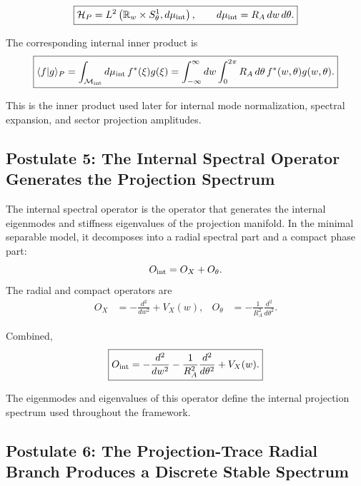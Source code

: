 \documentclass[11pt]{article}
\begin{document}
\begin{equation}
\boxed{
\mathcal H_P
=
L^2
\left(
\mathbb R_w\times S^1_\theta,
d\mu_{\rm int}
\right),
\qquad
d\mu_{\rm int}=R_A\,dw\,d\theta.
}
\end{equation}

The corresponding internal inner product is
\begin{equation}
\boxed{
\langle f|g\rangle_P
=
\int_{\mathcal M_{\rm int}}
d\mu_{\rm int}\,
f^*(\xi)g(\xi)
=
\int_{-\infty}^{\infty}dw
\int_0^{2\pi}
R_A\,d\theta\,
f^*(w,\theta)g(w,\theta).
}
\end{equation}

This is the inner product used later for internal mode normalization, spectral expansion, and sector projection amplitudes.

\subsection{Postulate 5: The Internal Spectral Operator Generates the Projection Spectrum}
\label{sec:postulate_internal_operator_projection_spectrum}

The internal spectral operator is the operator that generates the internal eigenmodes and stiffness eigenvalues of the projection manifold. In the minimal separable model, it decomposes into a radial spectral \cite{BenderWu1969} part and a compact phase part:
\begin{equation}
O_{\rm int}=O_X+O_\theta.
\end{equation}
The radial and compact operators are
\begin{align}
O_X
&=
-\frac{d^2}{dw^2}
+
V_X(w),
&
O_\theta
&=
-\frac{1}{R_A^2}
\frac{d^2}{d\theta^2}.
\end{align}

Combined,
\begin{equation}
\boxed{
O_{\rm int}
=
-\frac{d^2}{dw^2}
-
\frac{1}{R_A^2}
\frac{d^2}{d\theta^2}
+
V_X(w).
}
\end{equation}

The eigenmodes and eigenvalues of this operator define the internal projection spectrum used throughout the framework.

\subsection{Postulate 6: The Projection-Trace Radial Branch Produces a Discrete Stable Spectrum}
\label{sec:postulate_radial_confinement_discrete_stable_spectrum}
\label{sec:postulate_projection_trace_radial_branch}
\end{document}
